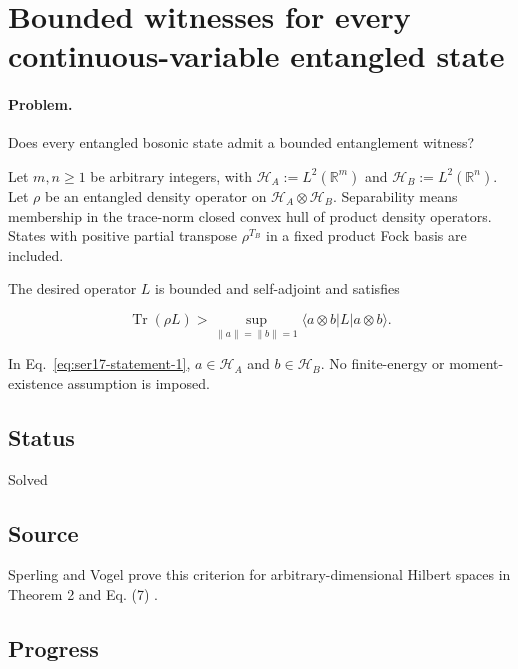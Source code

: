 \section{Bounded witnesses for every continuous-variable entangled state}
\label{sec:op_45127bf1f4f35d7a}

\paragraph{Problem.}
Does every entangled bosonic state admit a bounded entanglement witness?

Let $m,n\geq1$ be arbitrary integers, with $\mathcal H_A:=L^2(\mathbb R^m)$ and $\mathcal H_B:=L^2(\mathbb R^n)$. Let $\rho$ be an entangled density operator on $\mathcal H_A\otimes\mathcal H_B$. Separability means membership in the trace-norm closed convex hull of product density operators. States with positive partial transpose $\rho^{T_B}$ in a fixed product Fock basis are included.

The desired operator $L$ is bounded and self-adjoint and satisfies

\begin{equation}
\operatorname{Tr}(\rho L)>\sup_{\|a\|=\|b\|=1}\langle a\otimes b|L|a\otimes b\rangle.
\label{eq:ser17-statement-1}
\end{equation}

In Eq.~\eqref{eq:ser17-statement-1}, $a\in\mathcal H_A$ and $b\in\mathcal H_B$. No finite-energy or moment-existence assumption is imposed.

\subsection*{Status}

Solved

\subsection*{Source}

Sperling and Vogel prove this criterion for arbitrary-dimensional Hilbert spaces in Theorem 2 and Eq. (7) .

\subsection*{Progress}

